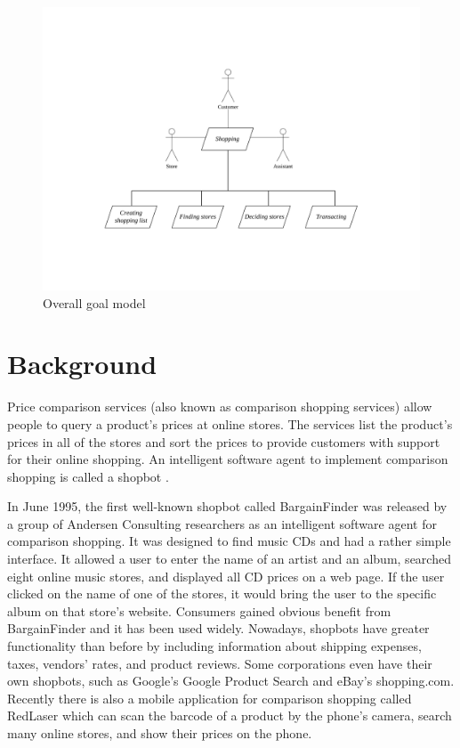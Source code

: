 \begin{figure}
\centering
\includegraphics[scale=0.7]{chap2/chap2-goal.pdf}
\caption{Overall goal model}
\label{ch2:fgoal}
\end{figure}

\section{Background}

Price comparison services (also known as comparison shopping services) allow people to query a product's prices at online stores. The services list the product's prices in all of the stores and sort the prices to provide customers with support for their online shopping. An intelligent software agent to implement comparison shopping is called a shopbot \cite{clark2000}. 

In June 1995, the first well-known shopbot called BargainFinder \cite{bargainfinder} was released by a group of Andersen Consulting researchers as an intelligent software agent for comparison shopping. It was designed to find music CDs and had a rather simple interface. It allowed a user to enter the name of an artist and an album, searched eight online music stores, and displayed all CD prices on a web page. If the user clicked on the name of one of the stores, it would bring the user to the specific album on that store's website. Consumers gained obvious benefit from BargainFinder and it has been used widely. Nowadays, shopbots have greater functionality than before by including information about shipping expenses, taxes, vendors' rates, and product reviews. Some corporations even have their own shopbots, such as Google's Google Product Search and eBay's shopping.com. Recently there is also a mobile application for comparison shopping called RedLaser which can scan the barcode of a product by the phone's camera, search many online stores, and show their prices on the phone.

